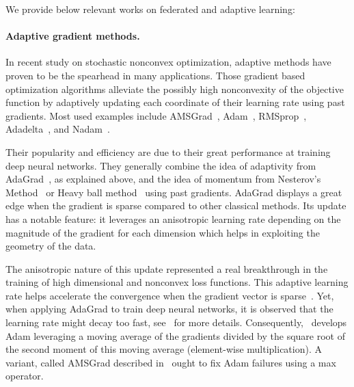 \documentclass[11pt]{article}
\begin{document}

We provide below relevant works on federated and adaptive learning:
\paragraph{Adaptive gradient methods.}
In recent study on stochastic nonconvex optimization, adaptive methods have proven to be the spearhead in many applications.
Those gradient based optimization algorithms alleviate the possibly high nonconvexity of the objective function by adaptively updating each coordinate of their learning rate using past gradients. Most used examples include AMSGrad~\citep{RKK18}, Adam~\citep{KB15}, RMSprop~\citep{TH12}, Adadelta~\citep{Z12}, and Nadam~\citep{D16}.

Their popularity and efficiency are due to their great performance at training deep neural networks.
They generally combine the idea of adaptivity from AdaGrad~\citep{DHS11,MS10}, as explained above, and the idea of momentum from Nesterov's Method~\citep{N04} or Heavy ball method~\citep{P64} using past gradients.
AdaGrad displays a great edge when the gradient is sparse compared to other classical methods.
Its update has a notable feature: it leverages an anisotropic learning rate depending on the magnitude of the gradient for each dimension which helps in exploiting the geometry of the data. 

The anisotropic nature of this update represented a real breakthrough in the training of high dimensional and nonconvex loss functions.
This adaptive learning rate helps accelerate the convergence when the gradient vector is sparse~\citep{DHS11}. Yet, when applying AdaGrad to train deep neural networks, it is observed that the learning rate might decay too fast, see~\citep{KB15} for more details.
Consequently,~\citet{KB15} develops Adam leveraging a moving average of the gradients divided by the square root of the second moment of this moving average (element-wise multiplication).
A variant, called AMSGrad described in~\citep{RKK18} ought to fix Adam failures using a max operator.
\end{document}
